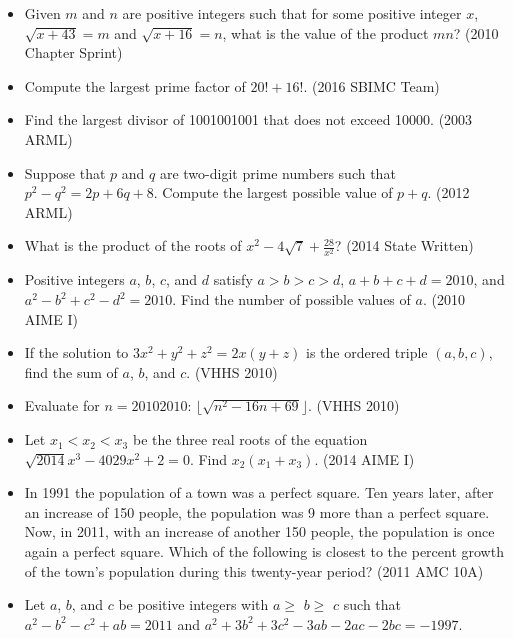 \documentclass{article}
\begin{document}
\begin{itemize}

\item Given $m$ and $n$ are positive integers such that for some positive integer $x$, $\sqrt{x+43}=m$ and $\sqrt{x+16}=n$, what is the value of the product $mn$? (2010 Chapter Sprint)

\item Compute the largest prime factor of $20!+16!$. (2016 SBIMC Team)

\item Find the largest divisor of 1001001001 that does not exceed 10000. (2003 ARML)

\item Suppose that $p$ and $q$ are two-digit prime numbers such that $p^2-q^2=2p+6q+8$. Compute the largest possible value of $p+q$. (2012 ARML)

\item What is the product of the roots of $x^2-4\sqrt{7}+\frac{28}{x^2}$? (2014 State Written)

\item Positive integers $a$, $b$, $c$, and $d$ satisfy $a > b > c > d$, $a + b + c + d = 2010$, and $a^2 - b^2 + c^2 - d^2 = 2010$. Find the number of possible values of $a$. (2010 AIME I)

\item If the solution to $3x^2+y^2+z^2=2x(y+z)$ is the ordered triple $(a,b,c)$, find the sum of $a$, $b$, and $c$. (VHHS 2010)

\item Evaluate for $n=20102010$: $\lfloor \sqrt{n^2-16n+69}\rfloor$. (VHHS 2010)

\item Let $x_1<x_2<x_3$ be the three real roots of the equation $\sqrt{2014}x^3-4029x^2+2=0$. Find $x_2(x_1+x_3)$. (2014 AIME I)

\item In 1991 the population of a town was a perfect square. Ten years later, after an increase of 150 people, the population was 9 more than a perfect square. Now, in 2011, with an increase of another 150 people, the population is once again a perfect square. Which of the following is closest to the percent growth of the town's population during this twenty-year period? (2011 AMC 10A)

\item Let $a$, $b$, and $c$ be positive integers with $a\ge$ $b\ge$ $c$ such that
$a^2-b^2-c^2+ab=2011$ and
$a^2+3b^2+3c^2-3ab-2ac-2bc=-1997$.


\end{itemize}
\end{document}
